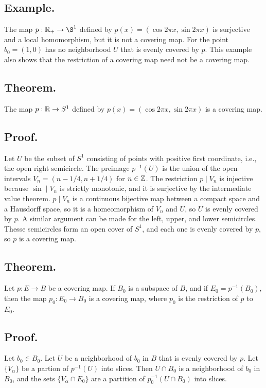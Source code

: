 \documentclass[titlepage]{article}
\begin{document}
\subsection{Example.} The map $p: \R_{+} \to \S^{1}$ defined by $p(x) = (\cos 2\pi x, \sin 2\pi x)$ is surjective and a local homomorphism, but it is not a covering map. For the point $b_{0} = (1, 0)$ has no neighborhood $U$ that is evenly covered by $p$. This example also shows that the restriction of a covering map need not be a covering map.

\subsection{Theorem.} The map $p: \mathbb{R} \to S^{1}$ defined by $p(x) = (\cos 2\pi x, \sin 2\pi x)$ is a covering map.

\subsection{Proof.} Let $U$ be the subset of $S^{1}$ consisting of points with positive first coordinate, i.e., the open right semicircle. The preimage $p^{-1}(U)$ is the union of the open intervals $V_{n} = (n-1/4, n+1/4)$ for $n \in \mathbb{Z}$. The restriction $p \mid V_{n}$ is injective because $\sin \mid V_{n}$ is strictly monotonic, and it is surjective by the intermediate value theorem. $p \mid V_{n}$ is a continuous bijective map between a compact space and a Hausdorff space, so it is a homeomorphism of $V_{n}$ and $U$, so $U$ is evenly covered by $p$. A similar argument can be made for the left, upper, and lower semicircles. Thesse semicircles form an open cover of $S^{1}$, and each one is evenly covered by $p$, so $p$ is a covering map.

\subsection{Theorem.} Let $p: E \to B$ be a covering map. If $B_{0}$ is a subspace of $B$, and if $E_{0} = p^{-1}(B_{0})$, then the map $p_{0}: E_{0} \to B_{0}$ is a covering map, where $p_{0}$ is the restriction of $p$ to $E_{0}$.

\subsection{Proof.} Let $b_{0} \in B_{0}$. Let $U$ be a neighborhood of $b_{0}$ in $B$ that is evenly covered by $p$. Let $\{V_{\alpha}\}$ be a partion of $p^{-1}(U)$ into slices. Then $U \cap B_{0}$ is a neighborhood of $b_{0}$ in $B_{0}$, and the sets $\{V_{\alpha} \cap E_{0}\}$ are a partition of $p_{0}^{-1}(U \cap B_{0})$ into slices.
\end{document}
